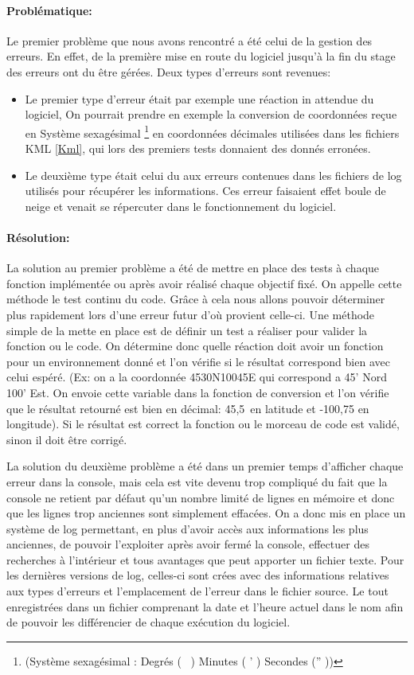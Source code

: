             \paragraph{Problématique:}
Le premier problème que nous avons rencontré a été celui de la gestion des erreurs. En effet, de la première mise en route du logiciel jusqu'à la fin du stage des erreurs ont du être gérées. Deux types d'erreurs sont revenues:
\begin{itemize}
    \item Le premier type d'erreur était par exemple une réaction in attendue du logiciel, On pourrait prendre en exemple la conversion de coordonnées reçue en Système sexagésimal \footnote{(Système sexagésimal : Degrés ( \degres\ ) Minutes ( ' ) Secondes ('' ))} en coordonnées décimales utilisées dans les fichiers KML \vref{Kml}, qui lors des premiers tests donnaient des donnés erronées.
    \item Le deuxième type était celui du aux erreurs contenues dans les fichiers de log utilisés pour récupérer les informations. Ces erreur faisaient effet boule de neige et venait se répercuter dans le fonctionnement du logiciel.
\end{itemize}\medskip

            \paragraph{Résolution:}
La solution au premier problème a été de mettre en place des tests à chaque fonction implémentée ou après avoir réalisé chaque objectif fixé. On appelle cette méthode le test continu du code. Grâce à cela nous allons pouvoir déterminer plus rapidement lors d'une erreur futur d'où provient celle-ci. Une méthode simple de la mette en place est de définir un test a réaliser pour valider la fonction ou le code. On détermine donc quelle réaction doit avoir un fonction pour un environnement donné et l'on vérifie si le résultat correspond bien avec celui espéré. (Ex: on a la coordonnée 4530N10045E qui correspond a 45' Nord 100' Est. On envoie cette variable dans la fonction de conversion et l'on vérifie que le résultat retourné est bien en décimal: 45,5\degres\ en latitude et -100,75 en longitude). Si le résultat est correct la fonction ou le morceau de code est validé, sinon il doit être corrigé.

La solution du deuxième problème a été dans un premier temps d'afficher chaque erreur dans la console, mais cela est vite devenu trop compliqué du fait que la console ne retient par défaut qu'un nombre limité de lignes en mémoire et donc que les lignes trop anciennes sont simplement effacées. On a donc mis en place un système de log permettant, en plus d'avoir accès aux informations les plus anciennes, de pouvoir l'exploiter après avoir fermé la console, effectuer des recherches à l'intérieur et tous avantages que peut apporter un fichier texte. Pour les dernières versions de log, celles-ci sont crées avec des informations relatives aux types d'erreurs et l'emplacement de l'erreur dans le fichier source. Le tout enregistrées dans un fichier comprenant la date et l'heure actuel dans le nom afin de pouvoir les différencier de chaque exécution du logiciel. 

